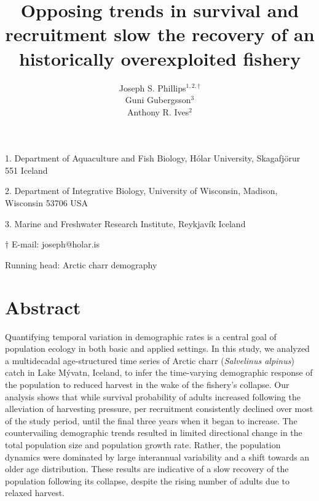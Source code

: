 \documentclass[11pt]{article}
\title{Opposing trends in survival and recruitment slow the recovery 
        of an historically overexploited fishery}
\author{
Joseph S. Phillips$^{1,2, \dagger}$ \\
Gu{\dh}ni Gu{\dh}bergsson$^{3}$ \\
Anthony R. Ives$^{2}$
}
\date{}
\begin{document}
\raggedright
\setlength\parindent{0.25in}

\maketitle


\noindent{} 1. Department of Aquaculture and Fish Biology, 
H\'{o}lar University, Skagafj\"{o}r{\dh}ur 551 Iceland

\noindent{} 2. Department of Integrative Biology, 
University of Wisconsin, Madison, Wisconsin 53706 USA

\noindent{} 3. Marine and Freshwater Research Institute, Reykjav\'{i}k Iceland

\noindent{} $\dagger$ E-mail: joseph@holar.is



\bigskip

Running head: {Arctic charr demography}

\linenumbers{}

\clearpage






\section*{Abstract} \label{abstract}

Quantifying temporal variation in demographic rates is a central goal of population ecology
in both basic and applied settings.
In this study, we analyzed a multidecadal age-structured time series 
of Arctic charr (\emph{Salvelinus alpinus}) catch  in Lake M\'{y}vatn, Iceland, 
to infer the time-varying demographic response of the population 
to reduced harvest in the wake of the fishery's collapse.
Our analysis shows that while survival probability of adults increased following the alleviation
of harvesting pressure, 
per recruitment consistently declined over most of the study period,
until the final three years when it began to increase.
The countervailing demographic trends resulted 
in limited directional change in the total population size and population growth rate.
Rather, the population dynamics were dominated by large interannual variability
and a shift towards an older age distribution.
These results are indicative of a slow recovery of the population following its collapse,
despite the rising number of adults due to relaxed harvest.
\end{document}
